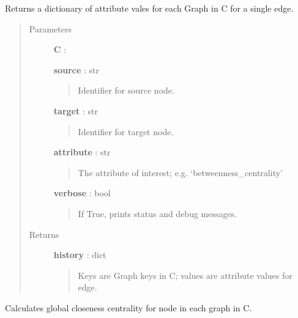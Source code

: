 \documentclass[letterpaper,10pt,english]{sphinxmanual}
\begin{document}
\begin{fulllineitems}
\label{tethne.analyze:tethne.analyze.collection.edge_history}
Returns a dictionary of attribute vales for each Graph in C for a single
edge.
\begin{quote}\begin{description}
\item[{Parameters }] \leavevmode
\textbf{C} : {\hyperref[tethne:tethne.data.GraphCollection]{}}

\textbf{source} : str
\begin{quote}

Identifier for source node.
\end{quote}

\textbf{target} : str
\begin{quote}

Identifier for target node.
\end{quote}

\textbf{attribute} : str
\begin{quote}

The attribute of interest; e.g. `betweenness\_centrality'
\end{quote}

\textbf{verbose} : bool
\begin{quote}

If True, prints status and debug messages.
\end{quote}

\item[{Returns }] \leavevmode
\textbf{history} : dict
\begin{quote}

Keys are Graph keys in C; values are attribute values for edge.
\end{quote}

\end{description}\end{quote}

\end{fulllineitems}


\begin{fulllineitems}
\label{tethne.analyze:tethne.analyze.collection.node_global_closeness_centrality}
Calculates global closeness centrality for node in each graph in
{\hyperref[tethne:tethne.data.GraphCollection]{}} C.

\end{fulllineitems}
\end{document}
